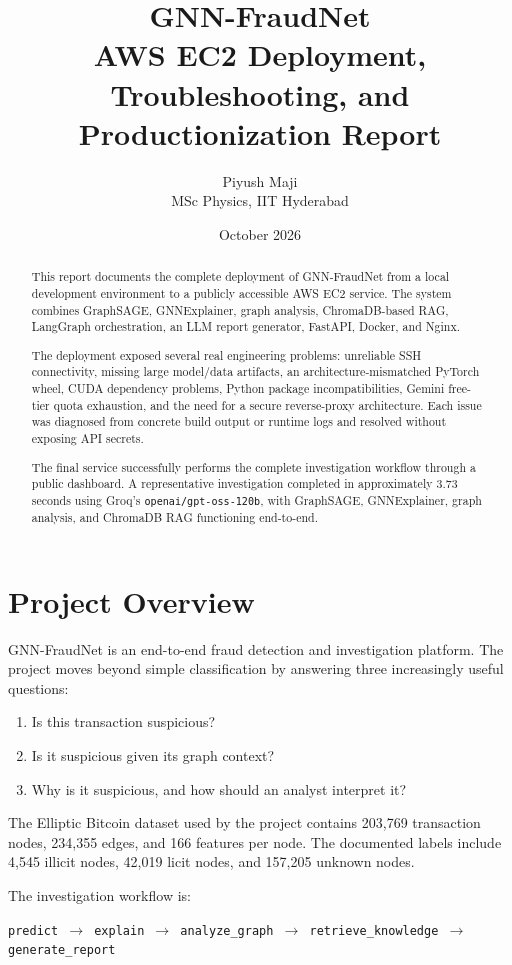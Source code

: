 \documentclass[11pt,a4paper]{article}
\title{\textbf{GNN-FraudNet}\\\large AWS EC2 Deployment, Troubleshooting, and Productionization Report}
\author{Piyush Maji\\MSc Physics, IIT Hyderabad}
\date{October 2026}
\begin{document}
\maketitle

\begin{abstract}
This report documents the complete deployment of GNN-FraudNet from a local development environment to a publicly accessible AWS EC2 service. The system combines GraphSAGE, GNNExplainer, graph analysis, ChromaDB-based RAG, LangGraph orchestration, an LLM report generator, FastAPI, Docker, and Nginx.

The deployment exposed several real engineering problems: unreliable SSH connectivity, missing large model/data artifacts, an architecture-mismatched PyTorch wheel, CUDA dependency problems, Python package incompatibilities, Gemini free-tier quota exhaustion, and the need for a secure reverse-proxy architecture. Each issue was diagnosed from concrete build output or runtime logs and resolved without exposing API secrets.

The final service successfully performs the complete investigation workflow through a public dashboard. A representative investigation completed in approximately 3.73 seconds using Groq's \texttt{openai/gpt-oss-120b}, with GraphSAGE, GNNExplainer, graph analysis, and ChromaDB RAG functioning end-to-end.
\end{abstract}

\tableofcontents
\newpage

\section{Project Overview}
GNN-FraudNet is an end-to-end fraud detection and investigation platform. The project moves beyond simple classification by answering three increasingly useful questions:
\begin{enumerate}
\item Is this transaction suspicious?
\item Is it suspicious given its graph context?
\item Why is it suspicious, and how should an analyst interpret it?
\end{enumerate}

The Elliptic Bitcoin dataset used by the project contains 203,769 transaction nodes, 234,355 edges, and 166 features per node. The documented labels include 4,545 illicit nodes, 42,019 licit nodes, and 157,205 unknown nodes.

The investigation workflow is:
\begin{center}
\texttt{predict $\rightarrow$ explain $\rightarrow$ analyze\_graph $\rightarrow$ retrieve\_knowledge $\rightarrow$ generate\_report}
\end{center}
\end{document}
